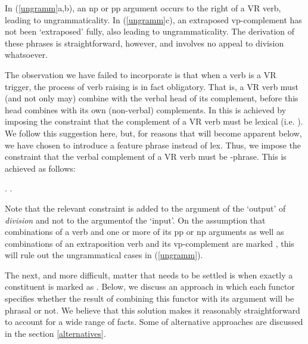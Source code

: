 \noindent In (\ref{ungramm}a,b), an {\sc np} or {\sc pp} argument occurs to the
right of a VR verb, leading to ungrammaticality.  In (\ref{ungramm}c), an extraposed
{\sc vp}-complement has not been `extraposed' fully, also leading to
ungrammaticality.  The derivation of these phrases is straightforward, however, and
involves no appeal to division whatsoever.


The observation we have failed to incorporate is that when a verb is a VR
trigger, the process of verb raising is in fact obligatory.  That is, a VR verb
must (and not only may) combine with the verbal head of its complement, before
this head combines with its own (non-verbal) complements.  In
 this is achieved by imposing the constraint that the
complement of a VR verb must be lexical (i.e.  {\sc [+lex]}).  We follow this
suggestion here, but, for reasons that will become apparent below, we have 
chosen
to introduce a feature {\sc phrase} instead of {\sc lex}.  Thus, we impose the
constraint that the verbal complement of a VR verb must be {\sc -phrase}.  This
is achieved as follows:

\pr
\pred
{}
. 
.
\epred
\epr

\noindent Note that the relevant constraint is added to the argument of the
`output' of {\em division} and not to the argumentof the `input'.  On the
assumption that combinations of a verb and one or more of its {\sc pp} or {\sc
np} arguments as well as combinations of an extraposition verb and its {\sc
vp}-complement are marked {\sc [+phrase]}, this will rule out the ungrammatical
cases in (\ref{ungramm}).

The next, and more difficult, matter that needs to be settled is when exactly a
constituent is marked as {\sc [+phrase]}.  Below, we discuss an approach in 
which each functor specifies whether the result of combining this functor with 
its argument will be phrasal or not. We believe that this solution makes it 
reasonably straightforward to account for a wide range of facts. Some of 
alternative approaches are discussed in the section \ref{alternatives}.  

